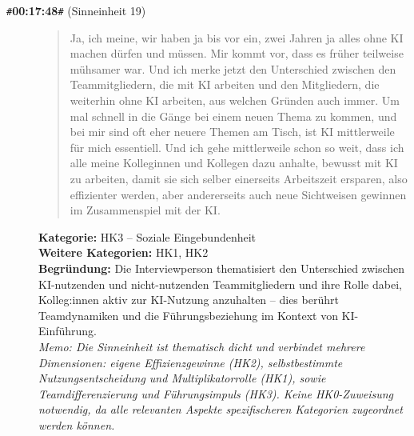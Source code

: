 \begin{description}
  \item[\texttt{\#}\textbf{00:17:48}\texttt{\#} (Sinneinheit 19)]
  \begin{quote}
  Ja, ich meine, wir haben ja bis vor ein, zwei Jahren ja alles ohne KI machen dürfen und müssen. Mir kommt vor, dass es früher teilweise mühsamer war. Und ich merke jetzt den Unterschied zwischen den Teammitgliedern, die mit KI arbeiten und den Mitgliedern, die weiterhin ohne KI arbeiten, aus welchen Gründen auch immer. Um mal schnell in die Gänge bei einem neuen Thema zu kommen, und bei mir sind oft eher neuere Themen am Tisch, ist KI mittlerweile für mich essentiell. Und ich gehe mittlerweile schon so weit, dass ich alle meine Kolleginnen und Kollegen dazu anhalte, bewusst mit KI zu arbeiten, damit sie sich selber einerseits Arbeitszeit ersparen, also effizienter werden, aber andererseits auch neue Sichtweisen gewinnen im Zusammenspiel mit der KI.
  \end{quote}
  \textbf{Kategorie:} HK3 -- Soziale Eingebundenheit\\
  \textbf{Weitere Kategorien:} HK1, HK2\\
  \textbf{Begr\"undung:} Die Interviewperson thematisiert den Unterschied zwischen KI-nutzenden und nicht-nutzenden Teammitgliedern und ihre Rolle dabei, Kolleg:innen aktiv zur KI-Nutzung anzuhalten – dies berührt Teamdynamiken und die Führungsbeziehung im Kontext von KI-Einführung.
  \\\textit{Memo: Die Sinneinheit ist thematisch dicht und verbindet mehrere Dimensionen: eigene Effizienzgewinne (HK2), selbstbestimmte Nutzungsentscheidung und Multiplikatorrolle (HK1), sowie Teamdifferenzierung und Führungsimpuls (HK3). Keine HK0-Zuweisung notwendig, da alle relevanten Aspekte spezifischeren Kategorien zugeordnet werden können.}
\end{description}
\medskip

